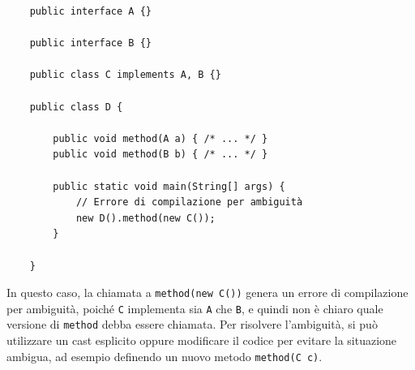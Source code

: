 \begin{verbatim}
    public interface A {}

    public interface B {}

    public class C implements A, B {}

    public class D {

        public void method(A a) { /* ... */ }
        public void method(B b) { /* ... */ }

        public static void main(String[] args) {
            // Errore di compilazione per ambiguità
            new D().method(new C());
        }

    }
\end{verbatim}
In questo caso, la chiamata a \texttt{method(new C())} genera un errore di compilazione per ambiguità, poiché \texttt{C} implementa sia \texttt{A} che \texttt{B}, e quindi non è chiaro quale versione di \texttt{method} debba essere chiamata. Per risolvere l'ambiguità, si può utilizzare un cast esplicito oppure modificare il codice per evitare la situazione ambigua, ad esempio definendo un nuovo metodo \texttt{method(C c)}.

